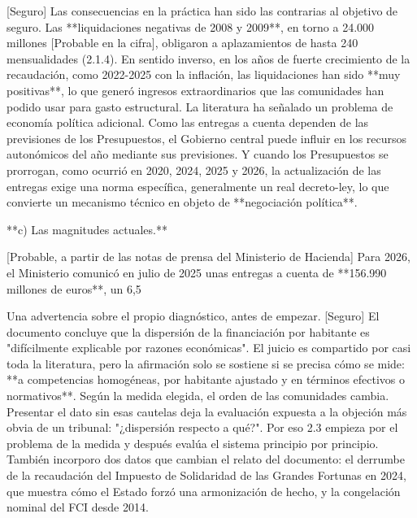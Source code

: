 \documentclass[10pt,a4paper]{article}
\begin{document}
[Seguro] Las consecuencias en la práctica han sido las contrarias al objetivo de seguro. Las **liquidaciones negativas de 2008 y 2009**, en torno a 24.000 millones [Probable en la cifra], obligaron a aplazamientos de hasta 240 mensualidades (2.1.4). En sentido inverso, en los años de fuerte crecimiento de la recaudación, como 2022-2025 con la inflación, las liquidaciones han sido **muy positivas**, lo que generó ingresos extraordinarios que las comunidades han podido usar para gasto estructural. La literatura ha señalado un problema de economía política adicional. Como las entregas a cuenta dependen de las previsiones de los Presupuestos, el Gobierno central puede influir en los recursos autonómicos del año mediante sus previsiones. Y cuando los Presupuestos se prorrogan, como ocurrió en 2020, 2024, 2025 y 2026, la actualización de las entregas exige una norma específica, generalmente un real decreto-ley, lo que convierte un mecanismo técnico en objeto de **negociación política**.

**c) Las magnitudes actuales.**

[Probable, a partir de las notas de prensa del Ministerio de Hacienda] Para 2026, el Ministerio comunicó en julio de 2025 unas entregas a cuenta de **156.990 millones de euros**, un 6,5%



Una advertencia sobre el propio diagnóstico, antes de empezar. [Seguro] El documento concluye que la dispersión de la financiación por habitante es "difícilmente explicable por razones económicas". El juicio es compartido por casi toda la literatura, pero la afirmación solo se sostiene si se precisa cómo se mide: **a competencias homogéneas, por habitante ajustado y en términos efectivos o normativos**. Según la medida elegida, el orden de las comunidades cambia. Presentar el dato sin esas cautelas deja la evaluación expuesta a la objeción más obvia de un tribunal: "¿dispersión respecto a qué?". Por eso 2.3 empieza por el problema de la medida y después evalúa el sistema principio por principio. También incorporo dos datos que cambian el relato del documento: el derrumbe de la recaudación del Impuesto de Solidaridad de las Grandes Fortunas en 2024, que muestra cómo el Estado forzó una armonización de hecho, y la congelación nominal del FCI desde 2014.
\end{document}
